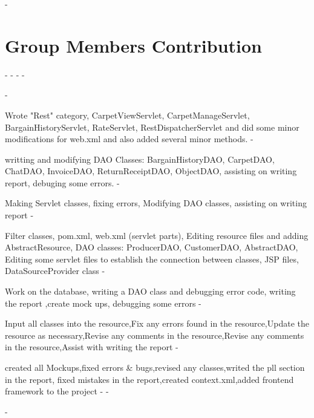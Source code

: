 -\section{Group Members Contribution}
-
-%
-
-\begin{description}
     -	\item[Mohammad Vanai] Wrote "Rest" category, CarpetViewServlet, CarpetManageServlet, BargainHistoryServlet, RateServlet, RestDispatcherServlet and did some minor modifications for web.xml and also added several minor methods.
     -	\item[Shahla Sadeghzadehdarandash] writting and modifying DAO Classes: BargainHistoryDAO, CarpetDAO, ChatDAO, InvoiceDAO, ReturnReceiptDAO, ObjectDAO, assisting on writing report, debuging some errors.
     -	\item[Shayan Sharifi] Making Servlet classes, fixing errors, Modifying DAO classes, assisting on writing report
     -	\item[Cemre Aka Aynur] Filter classes, pom.xml, web.xml (servlet parts), Editing resource files and adding AbstractResource, DAO classes: ProducerDAO, CustomerDAO, AbstractDAO, Editing some servlet files to establish the connection between classes, JSP files, DataSourceProvider class
     -	\item[Elham Norouzimehmandoustolia] Work on the database, writing a DAO class and debugging error code, writing the report ,create mock ups, debugging some errors
     -	\item[Mohammad Mohammadi] Input all classes into the resource,Fix any errors found in the resource,Update the resource as necessary,Revise any comments in the resource,Revise any comments in the resource,Assist with writing the report
     -	\item[Claudio Ianniello] created all Mockups,fixed errors & bugs,revised any classes,writed the pll section in the report, fixed mistakes in the report,created context.xml,added frontend framework to the project
     -
     -    \end{description}
-